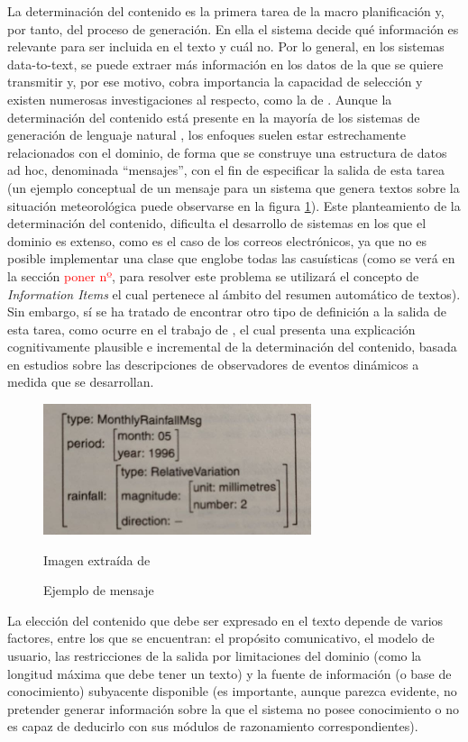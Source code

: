 La determinación del contenido es la primera tarea de la macro planificación y, por tanto, del proceso de generación. En ella el sistema decide qué información es relevante para ser incluida en el texto y cuál no. Por lo general, en los sistemas data-to-text, se puede extraer más información en los datos de la que se quiere transmitir y, por ese motivo, cobra importancia la capacidad de selección y existen numerosas investigaciones al respecto, como la de \cite{yu2007choosing}. Aunque la determinación del contenido está presente en la mayoría de los sistemas de generación de lenguaje natural \citep{mellish2006reference}, los enfoques suelen estar estrechamente relacionados con el dominio, de forma que se construye una estructura de datos ad hoc,  denominada ``mensajes'', con el fin de especificar la salida de esta tarea (un ejemplo conceptual de un mensaje para un sistema que genera textos sobre la situación meteorológica puede observarse en la figura \ref{fig:messagenlg}). Este planteamiento de la determinación del contenido, dificulta el desarrollo de sistemas en los que el dominio es extenso, como es el caso de los correos electrónicos, ya que no es posible implementar una clase que englobe todas las casuísticas (como se verá en la sección \textcolor{red}{poner nº}, para resolver este problema se utilizará el concepto de \textit{Information Items} el cual pertenece al ámbito del resumen automático de textos). Sin embargo, sí se ha tratado de encontrar otro tipo de definición a la salida de esta tarea, como ocurre en el trabajo de \cite{guhe2007incremental}, el cual presenta una explicación cognitivamente plausible e incremental de la determinación del contenido, basada en estudios sobre las descripciones de observadores de eventos dinámicos a medida que se desarrollan.

\begin{figure}[h]
	\centering%
	\centerline{\includegraphics[width = 0.7\textwidth]{Imagenes/Bitmap/message-nlg.jpg}}%
	\caption{Ejemplo de mensaje}%
	Imagen extraída de \cite{biblia}
	\label{fig:messagenlg}
\end{figure}

La elección del contenido que debe ser expresado en el texto depende de varios factores, entre los que se encuentran: el propósito comunicativo, el modelo de usuario, las restricciones de la salida por limitaciones del dominio (como la longitud máxima que debe tener un texto) y la fuente de información (o base de conocimiento) subyacente disponible (es importante, aunque parezca evidente, no pretender generar información sobre la que el sistema no posee conocimiento o no es capaz de deducirlo con sus módulos de razonamiento correspondientes).
